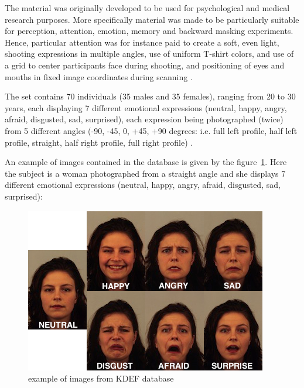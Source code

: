 \noindent The material was originally developed to be used for psychological and medical research purposes. More specifically material was made to be particularly suitable for perception, attention, emotion, memory and backward masking experiments. Hence, particular attention was for instance paid to create a soft, even light, shooting expressions in multiple angles, use of uniform T-shirt colors, and use of a grid to center participants face during shooting, and positioning of eyes and mouths in fixed image coordinates during scanning \cite{KDEF}.
\newline

\noindent The set contains 70 individuals (35 males and 35 females), ranging from 20 to 30 years, each displaying 7 different emotional expressions (neutral, happy, angry, afraid, disgusted, sad, surprised),
each expression being photographed (twice) from 5 different angles (-90, -45, 0, +45, +90 degrees: i.e. full left profile, half left profile, straight, half right profile, full right profile)  \cite{KDEF}.
\newline

\noindent An example of images contained in the database is given by the figure~\ref{kdef_7facialexpressions}. Here the subject is a woman photographed from a straight angle and she displays 7 different emotional expressions (neutral, happy, angry, afraid, disgusted, sad, surprised): 
\newline

\begin{figure}[!h]
\begin{center}
\noindent \includegraphics[scale=0.7]{figures/kdef_7facialexpressions} 
\newline
\caption{example of images from KDEF database}
\label{kdef_7facialexpressions}
\end{center} 
\end{figure}

